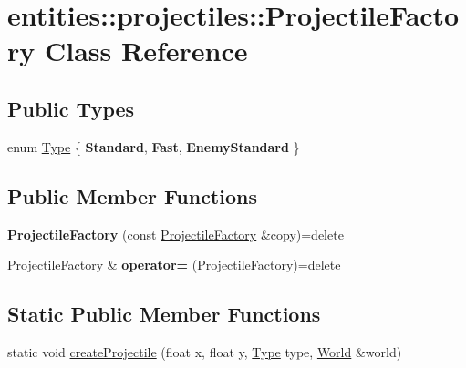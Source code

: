 \hypertarget{classentities_1_1projectiles_1_1ProjectileFactory}{}\section{entities\+:\+:projectiles\+:\+:Projectile\+Factory Class Reference}
\label{classentities_1_1projectiles_1_1ProjectileFactory}
\subsection*{Public Types}
\begin{DoxyCompactItemize}
\item 
enum \hyperlink{classentities_1_1projectiles_1_1ProjectileFactory_abc75eceeed2dbadc736fb93fd6046698}{Type} \{ {\bfseries Standard}, 
{\bfseries Fast}, 
{\bfseries Enemy\+Standard}
 \}
\end{DoxyCompactItemize}
\subsection*{Public Member Functions}
\begin{DoxyCompactItemize}
\item 
\mbox{\label{classentities_1_1projectiles_1_1ProjectileFactory_ad198f3f077022468b6bdd2d114c3a969}} 
{\bfseries Projectile\+Factory} (const \hyperlink{classentities_1_1projectiles_1_1ProjectileFactory}{Projectile\+Factory} \&copy)=delete
\item 
\mbox{\label{classentities_1_1projectiles_1_1ProjectileFactory_a23c5feb5df880e4cf133f7e9739deda7}} 
\hyperlink{classentities_1_1projectiles_1_1ProjectileFactory}{Projectile\+Factory} \& {\bfseries operator=} (\hyperlink{classentities_1_1projectiles_1_1ProjectileFactory}{Projectile\+Factory})=delete
\end{DoxyCompactItemize}
\subsection*{Static Public Member Functions}
\begin{DoxyCompactItemize}
\item 
static void \hyperlink{classentities_1_1projectiles_1_1ProjectileFactory_ae2fdae24114f0a54e474e1cf14eb34d5}{create\+Projectile} (float x, float y, \hyperlink{classentities_1_1projectiles_1_1ProjectileFactory_abc75eceeed2dbadc736fb93fd6046698}{Type} type, \hyperlink{classWorld}{World} \&world)
\end{DoxyCompactItemize}


